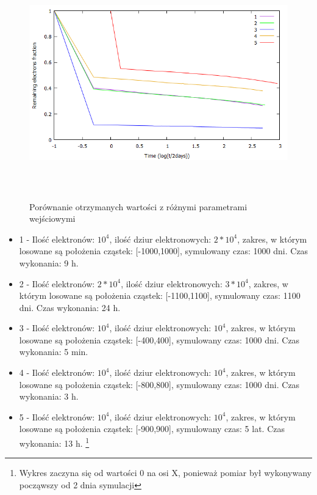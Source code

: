 \begin{figure}[H]
\centering
\includegraphics[width=17cm, height = 10cm]{wykres_all}
\caption{Porównanie otrzymanych wartości z różnymi parametrami wejściowymi}
\label{rys:1}
\end{figure}
\newpage
\begin{itemize}
\item 1 - Ilość elektronów: $10^{4}$, ilość dziur elektronowych: $2*10^{4}$, zakres, w którym losowane są położenia cząstek: [-1000,1000], symulowany czas: 1000 dni. Czas wykonania: 9 h.
\item 2 - Ilość elektronów: $2*10^{4}$, ilość dziur elektronowych: $3*10^{4}$, zakres, w którym losowane są położenia cząstek: [-1100,1100], symulowany czas: 1100 dni. Czas wykonania: 24 h.
\item 3 - Ilość elektronów: $10^{4}$, ilość dziur elektronowych: $10^{4}$, zakres, w którym losowane są położenia cząstek: [-400,400], symulowany czas: 1000 dni. Czas wykonania: 5 min.
\label{wykres:1}
\item 4 - Ilość elektronów: $10^{4}$, ilość dziur elektronowych: $10^{4}$, zakres, w którym losowane są położenia cząstek: [-800,800], symulowany czas: 1000 dni. Czas wykonania: 3 h.
\label{wykres:2}
\item 5 - Ilość elektronów: $10^{4}$, ilość dziur elektronowych: $10^{4}$, zakres, w którym losowane są położenia cząstek: [-900,900], symulowany czas: 5 lat. Czas wykonania: 13 h. \footnote{Wykres zaczyna się od wartości 0 na osi X, ponieważ pomiar był wykonywany począwszy od 2 dnia symulacji }
\end{itemize}


